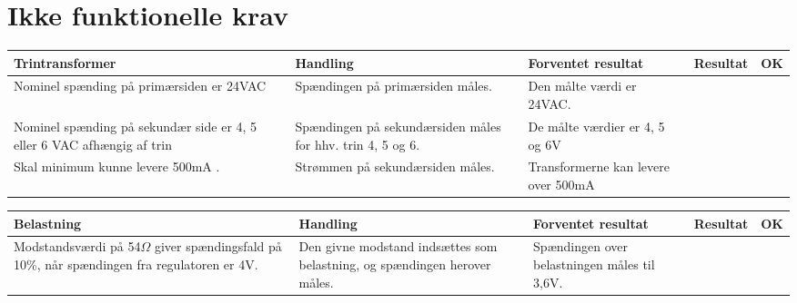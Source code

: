 \section{Ikke funktionelle krav}
\begin{table}[H]
	\centering
	\begin{tabular}{|p{4cm}|p{3cm}|p{3cm}|p{3cm}|p{1cm}|}
		\hline
		\textbf{Trintransformer} & \textbf{Handling} & \textbf{Forventet resultat} & \textbf{Resultat} &\textbf{OK} \\\hline
		Nominel spænding på primærsiden er 24VAC & Spændingen på primærsiden måles. & Den målte værdi er 24VAC. &  &  \\\hline
		Nominel spænding på sekundær side er 4, 5 eller 6 VAC afhængig af trin & Spændingen på sekundærsiden måles for hhv. trin 4, 5 og 6. & De målte værdier er 4, 5 og 6V &  & \\\hline
		Skal minimum kunne levere 500mA	. & Strømmen på sekundærsiden måles. & Transformerne kan levere over 500mA &   & \\\hline
	\end{tabular}
	
\end{table} 

\begin{table}[H]
	\centering
	\begin{tabular}{|p{4cm}|p{3cm}|p{3cm}|p{3cm}|p{1cm}|}
		\hline
		\textbf{Belastning} & \textbf{Handling} & \textbf{Forventet resultat} & \textbf{Resultat} &\textbf{OK} \\\hline
		Modstandsværdi på 54$\Omega$ giver spændingsfald på 10\%, når spændingen fra regulatoren er 4V. & Den givne modstand indsættes som belastning, og spændingen herover måles. & Spændingen over belastningen måles til 3,6V. &  &  \\\hline	
	\end{tabular}

	
\end{table}

